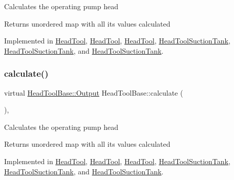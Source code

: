 Calculates the operating pump head

\begin{DoxyReturn}{Returns}
unordered map with all its values calculated 
\end{DoxyReturn}


Implemented in \hyperlink{class_head_tool_a1d3da7d9d78bdc0b29653a759d7d33af}{Head\+Tool}, \hyperlink{class_head_tool_a1d3da7d9d78bdc0b29653a759d7d33af}{Head\+Tool}, \hyperlink{class_head_tool_a1d3da7d9d78bdc0b29653a759d7d33af}{Head\+Tool}, \hyperlink{class_head_tool_suction_tank_ad91b31b9f524b9892da26e5ecb9e191e}{Head\+Tool\+Suction\+Tank}, \hyperlink{class_head_tool_suction_tank_ad91b31b9f524b9892da26e5ecb9e191e}{Head\+Tool\+Suction\+Tank}, and \hyperlink{class_head_tool_suction_tank_ad91b31b9f524b9892da26e5ecb9e191e}{Head\+Tool\+Suction\+Tank}.

\mbox{\label{class_head_tool_base_a82024c0ce01699aa24509c964267c392}} 
\subsubsection{\texorpdfstring{calculate()}{calculate()}\hspace{0.1cm}{\footnotesize\ttfamily [3/3]}}
{\footnotesize\ttfamily virtual \hyperlink{struct_head_tool_base_1_1_output}{Head\+Tool\+Base\+::\+Output} Head\+Tool\+Base\+::calculate (\begin{DoxyParamCaption}{ }\end{DoxyParamCaption})\hspace{0.3cm}{\ttfamily [protected]}, {}}

Calculates the operating pump head

\begin{DoxyReturn}{Returns}
unordered map with all its values calculated 
\end{DoxyReturn}


Implemented in \hyperlink{class_head_tool_a1d3da7d9d78bdc0b29653a759d7d33af}{Head\+Tool}, \hyperlink{class_head_tool_a1d3da7d9d78bdc0b29653a759d7d33af}{Head\+Tool}, \hyperlink{class_head_tool_a1d3da7d9d78bdc0b29653a759d7d33af}{Head\+Tool}, \hyperlink{class_head_tool_suction_tank_ad91b31b9f524b9892da26e5ecb9e191e}{Head\+Tool\+Suction\+Tank}, \hyperlink{class_head_tool_suction_tank_ad91b31b9f524b9892da26e5ecb9e191e}{Head\+Tool\+Suction\+Tank}, and \hyperlink{class_head_tool_suction_tank_ad91b31b9f524b9892da26e5ecb9e191e}{Head\+Tool\+Suction\+Tank}.


